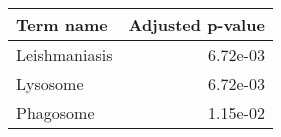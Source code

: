 \begin{tabular}{lr}
\toprule
    Term name &  Adjusted p-value \\
\midrule
Leishmaniasis &          6.72e-03 \\
     Lysosome &          6.72e-03 \\
    Phagosome &          1.15e-02 \\
\bottomrule
\end{tabular}
